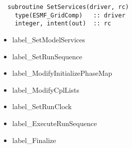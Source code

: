 \begin{verbatim}  subroutine SetServices(driver, rc)
    type(ESMF_GridComp)   :: driver
    integer, intent(out)  :: rc
\end{verbatim}

\begin{itemize}
\item label\_SetModelServices
\item label\_SetRunSequence
\item label\_ModifyInitializePhaseMap
\item label\_ModifyCplLists
\item label\_SetRunClock
\item label\_ExecuteRunSequence
\item label\_Finalize
\end{itemize}

